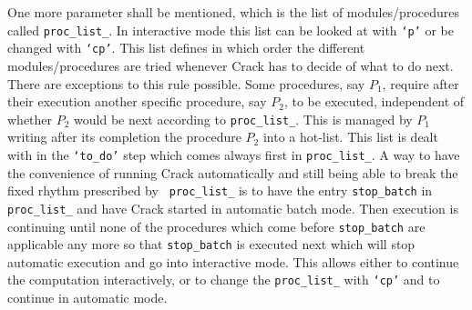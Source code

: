 \documentclass[12pt]{article}
\begin{document}
One more parameter shall be mentioned, which is the list of modules/procedures
called {\tt proc\_list\_}. In interactive mode this list can be looked
at with {\tt `p'} or be changed with {\tt `cp'}. This list defines
in which order the different modules/procedures are tried whenever
{\sc Crack} has to decide of what to do next. There are exceptions
to this rule possible. Some procedures, say
$P_1$, require after their execution another
specific procedure, say $P_2$, to be executed, independent of whether
$P_2$ would be next according to {\tt proc\_list\_}. This is managed by $P_1$
writing after its completion the procedure $P_2$
into a hot-list. This list is dealt with in the {\tt `to\_do'} step which
comes always first in {\tt proc\_list\_}. 
A way to have the convenience of running {\sc Crack} automatically
and still being able to break the fixed rhythm prescribed by {\tt
proc\_list\_} is to have the entry {\tt stop\_batch} in {\tt proc\_list\_}
and have {\sc
Crack} started in automatic batch mode. Then execution is continuing
until none of the procedures which come before {\tt stop\_batch} are
applicable any more so that {\tt stop\_batch} is executed next which will
stop automatic execution and go into interactive mode. This allows
either to continue the computation interactively, or to change the 
{\tt proc\_list\_} with {\tt `cp'} and to continue in automatic mode.
\end{document}
